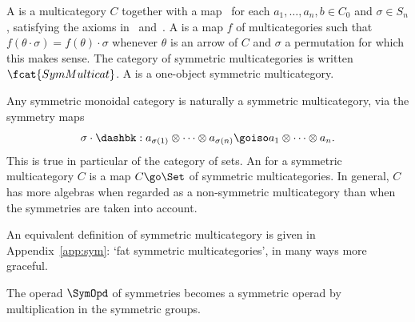 \begin{defn}	
A  is a multicategory $C$ together with a
map~ for each $a_1, \ldots, a_n, b \in C_0$ and
$\sigma\in S_n$, satisfying the axioms in~
and~.  A  is
a map $f$ of multicategories such that $f(\theta\cdot\sigma) = f(\theta)
\cdot\sigma$ whenever $\theta$ is an arrow of $C$ and $\sigma$ a
permutation for which this makes sense.  The category of symmetric
multicategories is written $\fcat{SymMulticat}$.%
% 
% 
 A  is a one-object symmetric multicategory.
\end{defn}

Any symmetric monoidal category is naturally a symmetric multicategory,%
%
%
via the symmetry maps
\[
\sigma\cdot\dashbk:
a_{\sigma(1)} \otimes\cdots\otimes a_{\sigma(n)}
\goiso
a_1 \otimes\cdots\otimes a_n.
\]
This is true in particular of the category of sets.  An %
%
%
%
%
%
%
% 
for a symmetric multicategory $C$ is a map $C \go \Set$ of symmetric
multicategories.  In general, $C$ has more algebras when regarded as a
non-symmetric multicategory than when the symmetries are taken into
account.

An equivalent definition of symmetric multicategory is given in
Appendix~\ref{app:sym}: `fat symmetric multicategories', in many ways more
graceful.

\begin{example}
The operad $\SymOpd$%
% 
% 
of symmetries%
%
%
becomes a symmetric operad by
multiplication in the symmetric groups. 
\end{example}

